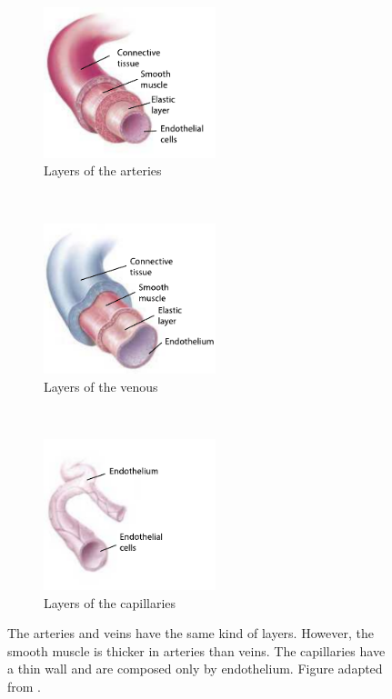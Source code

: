 \begin{figure}[!htbp]
	\centering
	\begin{subfigure}[t]{0.33\textwidth}
		\centering
		\includegraphics[width=5cm]{figure1a}
		\caption{Layers of the arteries}
		\label{fig:arteries composition}
	\end{subfigure}%
	~ 
	\begin{subfigure}[t]{0.33\textwidth}
		\centering
		\includegraphics[width=5cm]{figure1c}
		\caption{Layers of the venous}
		\label{fig:veins composition}
	\end{subfigure}
	~ 
	\begin{subfigure}[t]{0.33\textwidth}
		\centering
		\includegraphics[width=5cm, trim={0 0 2cm 0},clip]{figure1b}
		\caption{Layers of the capillaries}
		\label{fig:capillaries composition}
	\end{subfigure}
	\caption[Layers of the blood vessels]{The arteries and veins have the same kind of layers. However, the smooth muscle is thicker in arteries than veins. The capillaries have a thin wall and are composed only by endothelium. Figure adapted from \cite{johnson2001biology}.}
	\label{fig:vessels composition}
\end{figure}

